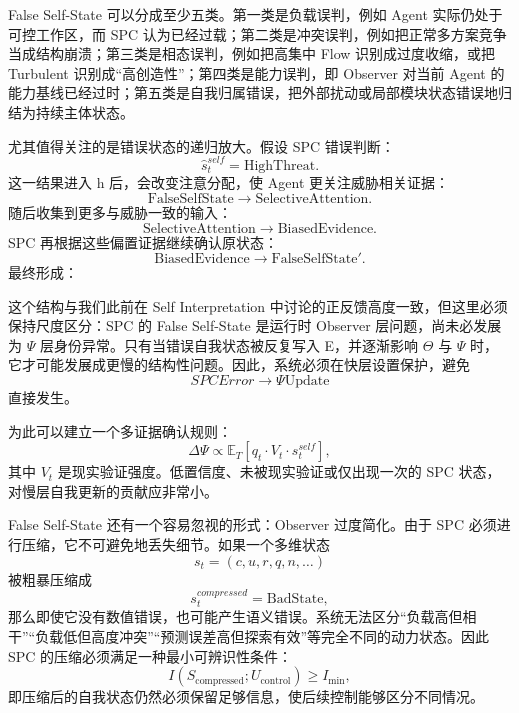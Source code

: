 False Self-State 可以分成至少五类。第一类是负载误判，例如 Agent 实际仍处于可控工作区，而 SPC 认为已经过载；第二类是冲突误判，例如把正常多方案竞争当成结构崩溃；第三类是相态误判，例如把高集中 Flow 识别成过度收缩，或把 Turbulent 识别成“高创造性”；第四类是能力误判，即 Observer 对当前 Agent 的能力基线已经过时；第五类是自我归属错误，把外部扰动或局部模块状态错误地归结为持续主体状态。

尤其值得关注的是错误状态的递归放大。假设 SPC 错误判断：
\begin{equation}
\hat s_t^{self}
=
\mathrm{HighThreat}.
\end{equation}
这一结果进入 h 后，会改变注意分配，使 Agent 更关注威胁相关证据：
\begin{equation}
\mathrm{FalseSelfState}
\rightarrow
\mathrm{SelectiveAttention}.
\end{equation}
随后收集到更多与威胁一致的输入：
\begin{equation}
\mathrm{SelectiveAttention}
\rightarrow
\mathrm{BiasedEvidence}.
\end{equation}
SPC 再根据这些偏置证据继续确认原状态：
\begin{equation}
\mathrm{BiasedEvidence}
\rightarrow
\mathrm{FalseSelfState}'.
\end{equation}
最终形成：
\begin{statementbox}
\centering
{}
\end{statementbox}

这个结构与我们此前在 Self Interpretation 中讨论的正反馈高度一致，但这里必须保持尺度区分：SPC 的 False Self-State 是运行时 Observer 层问题，尚未必发展为 $\Psi$ 层身份异常。只有当错误自我状态被反复写入 E，并逐渐影响 $\Theta$ 与 $\Psi$ 时，它才可能发展成更慢的结构性问题。因此，系统必须在快层设置保护，避免
\begin{equation}
SPCError
\rightarrow
\Psi\mathrm{Update}
\end{equation}
直接发生。

为此可以建立一个多证据确认规则：
\begin{equation}
\Delta\Psi
\propto
\mathbb E_T
\left[
q_t
\cdot
V_t
\cdot
s_t^{self}
\right],
\end{equation}
其中 $V_t$ 是现实验证强度。低置信度、未被现实验证或仅出现一次的 SPC 状态，对慢层自我更新的贡献应非常小。

False Self-State 还有一个容易忽视的形式：Observer 过度简化。由于 SPC 必须进行压缩，它不可避免地丢失细节。如果一个多维状态
\begin{equation}
s_t
=
(c,u,r,q,n,\ldots)
\end{equation}
被粗暴压缩成
\begin{equation}
s_t^{compressed}
=
\mathrm{BadState},
\end{equation}
那么即使它没有数值错误，也可能产生语义错误。系统无法区分“负载高但相干”“负载低但高度冲突”“预测误差高但探索有效”等完全不同的动力状态。因此 SPC 的压缩必须满足一种最小可辨识性条件：
\begin{equation}
I(S_{\mathrm{compressed}};U_{\mathrm{control}})
\geq
I_{\min},
\end{equation}
即压缩后的自我状态仍然必须保留足够信息，使后续控制能够区分不同情况。


